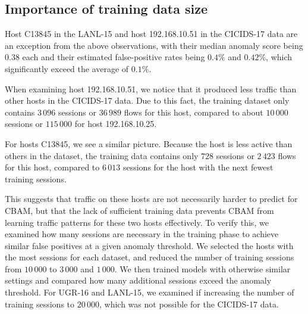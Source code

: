 \subsection{Importance of training data size}


Host C13845 in the LANL-15 and host 192.168.10.51 in the CICIDS-17 data are an exception from the above observations, with their median anomaly score being $0.38$ each and their estimated false-positive rates being $0.4\%$ and $0.42\%$, which significantly exceed the average of $0.1\%$. 

When examining host 192.168.10.51, we notice that it produced less traffic than other hosts in the CICIDS-17 data. Due to this fact, the training dataset only contains $3\,096$ sessions or $36\,989$ flows for this host, compared to about $10\,000$ sessions or $115\,000$ for host 192.168.10.25. 


For hosts C13845, we see a similar picture. Because the host is less active than others in the dataset,
 the training data contains only $728$ sessions or $2\,423$ flows for this host, compared to $6\,013$ sessions for the host with the next fewest training sessions. 



This suggests that traffic on these hosts are not necessarily harder to predict for CBAM, but that the lack of sufficient training data prevents CBAM from learning traffic patterns for these two hosts effectively. To verify this, we examined how many sessions are necessary in the training phase to achieve similar false positives at a given anomaly threshold. 
We selected the hosts with the most sessions for each dataset, and reduced the number of training sessions from $10\,000$ to $3\,000$ and $1\,000$. We then trained models with otherwise similar settings and compared how many additional sessions exceed the anomaly threshold. For UGR-16 and LANL-15, we examined if increasing the number of training sessions to $20\,000$, which was not possible for the CICIDS-17 data.

